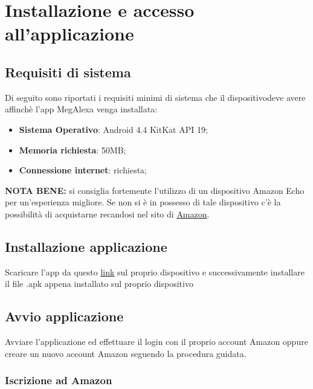 \chapter{Installazione e accesso all'applicazione}
\label{Installazione}

\section{Requisiti di sistema}
Di seguito sono riportati i requisiti minimi di sistema che il dispositivodeve avere affinchè l'app MegAlexa venga installata: 

\begin{itemize}
	\item \textbf{Sistema Operativo}: Android 4.4 KitKat API 19;
	\item \textbf{Memoria richiesta}: 50MB;
	\item \textbf{Connessione internet}: richiesta;
\end{itemize}

\textbf{NOTA BENE:} si consiglia fortemente l'utilizzo di un dispositivo Amazon Echo per un'esperienza migliore. Se non si è in possesso di tale dispositivo c'è la possibilità di acquistarne recandosi nel sito di \href{https://www.amazon.it}{Amazon}.

\section{Installazione applicazione}
Scaricare l'app da questo \href{https://www.google.com/drive/}{link} sul proprio dispositivo
e successivamente installare il file .apk appena installato sul proprio dispositivo

\section{Avvio applicazione}
Avviare l'applicazione ed effettuare il login con il proprio account Amazon oppure creare un nuovo account Amazon seguendo la procedura guidata.
\newpage
\subsection{Iscrizione ad Amazon}

